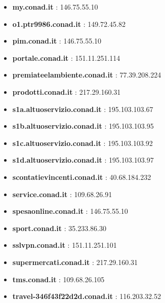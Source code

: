 \documentclass{article}
\begin{document}
\begin{itemize}
        \item \textbf{ my.conad.it }: 146.75.55.10
    
        \item \textbf{ o1.ptr9986.conad.it }: 149.72.45.82
    
        \item \textbf{ pim.conad.it }: 146.75.55.10
    
        \item \textbf{ portale.conad.it }: 151.11.251.114
    
        \item \textbf{ premiateelambiente.conad.it }: 77.39.208.224
    
        \item \textbf{ prodotti.conad.it }: 217.29.160.31
    
        \item \textbf{ s1a.altuoservizio.conad.it }: 195.103.103.67
    
        \item \textbf{ s1b.altuoservizio.conad.it }: 195.103.103.95
    
        \item \textbf{ s1c.altuoservizio.conad.it }: 195.103.103.92
    
        \item \textbf{ s1d.altuoservizio.conad.it }: 195.103.103.97
    
        \item \textbf{ scontatievincenti.conad.it }: 40.68.184.232
    
        \item \textbf{ service.conad.it }: 109.68.26.91
    
        \item \textbf{ spesaonline.conad.it }: 146.75.55.10
    
        \item \textbf{ sport.conad.it }: 35.233.86.30
    
        \item \textbf{ sslvpn.conad.it }: 151.11.251.101
    
        \item \textbf{ supermercati.conad.it }: 217.29.160.31
    
        \item \textbf{ tms.conad.it }: 109.68.26.105
    
        \item \textbf{ travel-346f43f22d2d.conad.it }: 116.203.32.52
    

\end{itemize}
\end{document}
